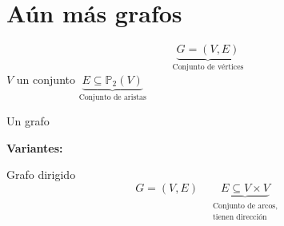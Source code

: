 \documentclass[../main.tex]{subfiles}
\begin{document}
\chapter{Aún más grafos}%

\thispagestyle{fancy}

\[
	\underbrace
	{
		G=(V,E)
	}_
	{
		\text{Conjunto de vértices}
	}
\]
$V$ un conjunto
\(
	\underbrace
	{
		E\subseteq\mathbb{P}_2(V)
	}_
	{
		\text{Conjunto de aristas}
	}
\)

Un grafo

\textbf{Variantes:}

Grafo dirigido
\[
	G=(V,E)
	\quad
	\underbrace
	{
		E\subseteq V\times V
	}_
	{
		\substack
		{
			\text{Conjunto de arcos,}\\
			\text{tienen dirección}
		}
	}
\]
\begin{figure}[H]
	\centering
	
\end{figure}

\begin{figure}[H]
	\centering
	
\end{figure}

\begin{figure}[H]
	\centering
	
\end{figure}

\begin{figure}[H]
	\centering
	
\end{figure}
\end{document}

